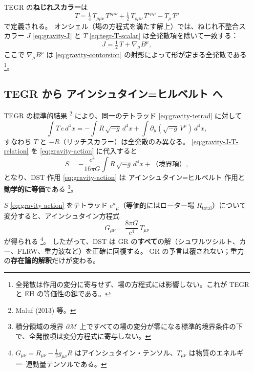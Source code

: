 \documentclass[dvipdfmx,a4paper,oneside]{jsbook}
\numberwithin{equation}{chapter}
\begin{document}
TEGR の\textbf{ねじれスカラー}は
\begin{equation}
  T
  = \tfrac{1}{4}\, T_{\rho\mu\nu}\, T^{\rho\mu\nu}
  + \tfrac{1}{2}\, T_{\rho\mu\nu}\, T^{\nu\mu\rho}
  - T_\rho\, T^\rho
  \label{eq:tegr-T-scalar}
\end{equation}
で定義される。
オンシェル（場の方程式を満たす解上）では、ねじれ不整合スカラー \(J\) \eqref{eq:gravity-J} と \(T\) \eqref{eq:tegr-T-scalar} は全発散項を除いて一致する：
\begin{equation}
  J = \tfrac{1}{2}\, T + \nabla_\mu B^\mu,
  \label{eq:gravity-J-T-relation}
\end{equation}
ここで \(\nabla_\mu B^\mu\) は \eqref{eq:gravity-contorsion} の射影によって形が定まる全発散である \footnote{全発散は作用の変分に寄与せず、場の方程式には影響しない。これが TEGR と EH の等価性の鍵である。}。

\subsection{TEGR から アインシュタイン=ヒルベルト へ}

TEGR の標準的結果 \footnote{Maluf (2013) 等。} により、同一のテトラッド \eqref{eq:gravity-tetrad} に対して
\begin{equation}
  \int T\, e\, d^4x
  = -\int R\, \sqrt{-g}\, d^4x
  + \int \partial_\mu(\sqrt{-g}\, V^\mu)\, d^4x,
  \label{eq:tegr-integral}
\end{equation}
すなわち \(T\) と \(-R\)（リッチスカラー）は全発散のみ異なる。
\eqref{eq:gravity-J-T-relation} を \eqref{eq:gravity-action} に代入すると
\begin{equation}
  S
  = -\frac{c^4}{16\pi G} \int R\, \sqrt{-g}\, d^4x
  + \text{（境界項）},
  \label{eq:gravity-EH-equivalence}
\end{equation}
となり、DST 作用 \eqref{eq:gravity-action} は アインシュタイン=ヒルベルト 作用と\textbf{動学的に等価}である \footnote{積分領域の境界 \(\partial\mathcal{M}\) 上ですべての場の変分が零になる標準的境界条件の下で、全発散項は変分方程式に寄与しない。}。

\(S\) \eqref{eq:gravity-action} をテトラッド \(e^a{}_\mu\)（等価的にはローター場 \(R_{\mathrm{total}}\)）について変分すると、アインシュタイン方程式
\begin{equation}
  G_{\mu\nu} = \frac{8\pi G}{c^4}\, T_{\mu\nu}
  \label{eq:gravity-einstein}
\end{equation}
が得られる \footnote{\(G_{\mu\nu} = R_{\mu\nu} - \tfrac{1}{2} g_{\mu\nu} R\) はアインシュタイン・テンソル、\(T_{\mu\nu}\) は物質のエネルギー--運動量テンソルである。}。
したがって、DST は GR の\textbf{すべて}の解（シュワルツシルト、カー、FLRW、重力波など）を正確に回復する。
GR の予言は覆されない；重力の\textbf{存在論的解釈}だけが変わる。
\end{document}
